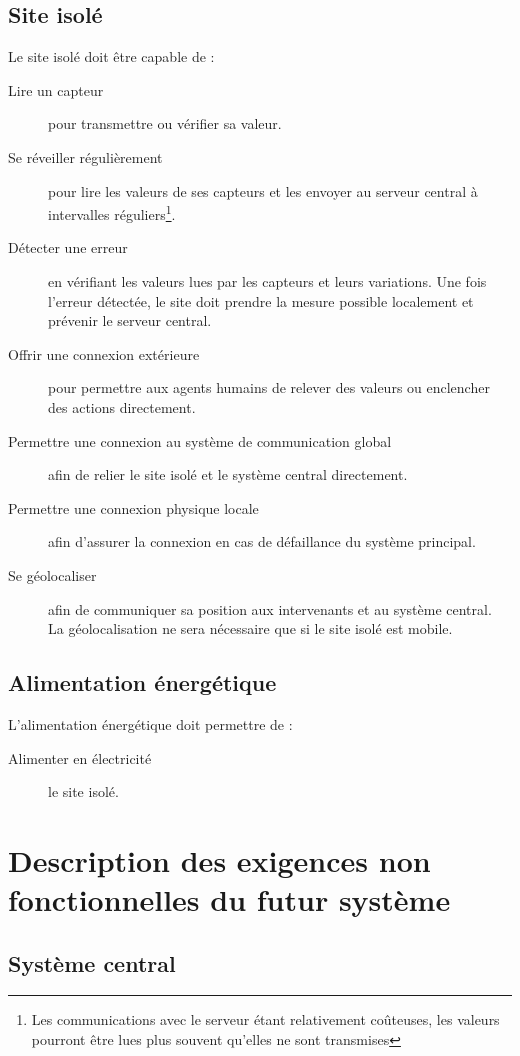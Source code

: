 \documentclass[a4paper, 11pt]{article}
\begin{document}
\subsection{Site isolé}
Le site isolé doit être capable de :
\begin{description}
	\item[Lire un capteur] pour transmettre ou vérifier sa valeur.
	\item[Se réveiller régulièrement] pour lire les valeurs de ses capteurs et les envoyer au serveur central à intervalles réguliers\footnote{Les communications avec le serveur étant relativement coûteuses, les valeurs pourront être lues plus souvent qu'elles ne sont transmises}.
	\item[Détecter une erreur] en vérifiant les valeurs lues par les capteurs et leurs variations. Une fois l'erreur détectée, le site doit prendre la mesure possible localement et prévenir le serveur central.
	\item[Offrir une connexion extérieure] pour permettre aux agents humains de relever des valeurs ou enclencher des actions directement.
	\item[Permettre une connexion au système de communication global] afin de relier le site isolé et le système central directement.
	\item[Permettre une connexion physique locale] afin d'assurer la connexion en cas de défaillance du système principal.
	\item[Se géolocaliser] afin de communiquer sa position aux intervenants et au système central. La géolocalisation ne sera nécessaire que si le site isolé est mobile.
\end{description}

\subsection{Alimentation énergétique}
L'alimentation énergétique doit permettre de :
\begin{description}
\item[Alimenter en électricité] le site isolé.
\end{description}



\section{Description des exigences non fonctionnelles du futur système}
\subsection{Système central}
\end{document}
